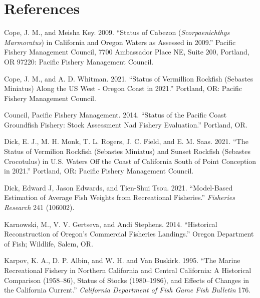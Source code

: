 \documentclass[11pt,
  english,
  letterpaper,
]{article}
\newlength{\cslhangindent}
\newenvironment{CSLReferences}[2] %
 {%
  \setlength{\parindent}{0pt}
  \ifodd #1 \everypar{\setlength{\hangindent}{\cslhangindent}}\ignorespaces\fi
  \ifnum #2 > 0
  \setlength{\parskip}{#2\baselineskip}
  \fi
 }%
 {}
\begin{document}
\clearpage

\hypertarget{references}{%
\section{References}\label{references}}

\hypertarget{refs}{}
\begin{CSLReferences}{1}{0}
\leavevmode{}%
Cope, J. M., and Meisha Key. 2009. {``Status of Cabezon (\emph{{Scorpaenichthys} Marmoratus}) in {California} and {Oregon} Waters as Assessed in 2009.''} Pacific Fishery Management Council, 7700 Ambassador Place NE, Suite 200, Portland, OR 97220: Pacific Fishery Management Council.

\leavevmode{}%
Cope, J. M., and A. D. Whitman. 2021. {``Status of {V}ermillion Rockfish ({S}ebastes Miniatus) Along the {US} {W}est - {O}regon Coast in 2021.''} Portland, OR: Pacific Fishery Management Council.

\leavevmode{}%
Council, Pacific Fishery Management. 2014. {``Status of the {P}acific Coast Groundfish Fishery: Stock Assessment Nad Fishery Evaluation.''} Portland, OR.

\leavevmode{}%
Dick, E. J., M. H. Monk, T. L. Rogers, J. C. Field, and E. M. Saas. 2021. {``The Status of Vermilion Rockfish ({S}ebastes Miniatus) and Sunset Rockfish ({S}ebastes Crocotulus) in {U}.{S}. Waters Off the Coast of {C}alifornia South of {P}oint {C}onception in 2021.''} Portland, OR: Pacific Fishery Management Council.

\leavevmode{}%
Dick, Edward J, Jason Edwards, and Tien-Shui Tsou. 2021. {``Model-Based Estimation of Average Fish Weights from Recreational Fisheries.''} \emph{Fisheries Research} 241 (106002).

\leavevmode{}%
Karnowski, M., V. V. Gertseva, and Andi Stephens. 2014. {``Historical {Reconstruction} of {Oregon}'s {Commercial} {Fisheries} {Landings}.''} Oregon Department of Fish; Wildlife, Salem, OR.

\leavevmode{}%
Karpov, K. A., D. P. Albin, and W. H. and Van Buskirk. 1995. {``The Marine Recreational Fishery in Northern {C}alifornia and Central {C}alifornia: A Historical Comparison (1958--86), Status of Stocks (1980--1986), and Effects of Changes in the {C}alifornia {C}urrent.''} \emph{California Department of Fish Game Fish Bulletin} 176.


\end{CSLReferences}
\end{document}
